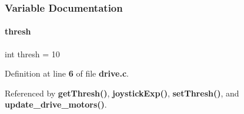 \subsubsection{Variable Documentation}
\mbox{\label{drive_8c_a6cf8bf160a02413bc3d5d18b0294b581}} 
\paragraph{thresh}
{\footnotesize\ttfamily int thresh = 10\hspace{0.3cm}{\ttfamily [static]}}



Definition at line \textbf{ 6} of file \textbf{ drive.\+c}.



Referenced by \textbf{ get\+Thresh()}, \textbf{ joystick\+Exp()}, \textbf{ set\+Thresh()}, and \textbf{ update\+\_\+drive\+\_\+motors()}.


